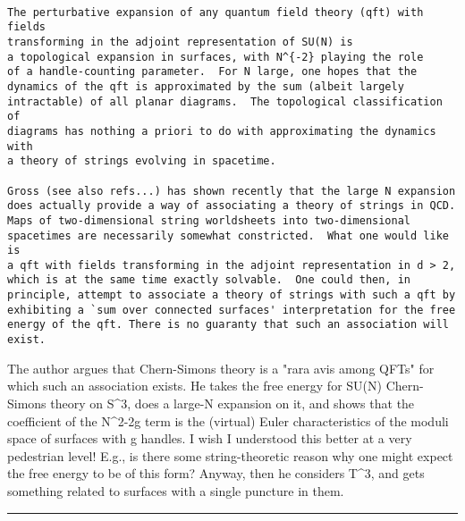\begin{verbatim}

The perturbative expansion of any quantum field theory (qft) with fields
transforming in the adjoint representation of SU(N) is
a topological expansion in surfaces, with N^{-2} playing the role
of a handle-counting parameter.  For N large, one hopes that the
dynamics of the qft is approximated by the sum (albeit largely
intractable) of all planar diagrams.  The topological classification of
diagrams has nothing a priori to do with approximating the dynamics with
a theory of strings evolving in spacetime.

Gross (see also refs...) has shown recently that the large N expansion
does actually provide a way of associating a theory of strings in QCD.
Maps of two-dimensional string worldsheets into two-dimensional
spacetimes are necessarily somewhat constricted.  What one would like is
a qft with fields transforming in the adjoint representation in d > 2,
which is at the same time exactly solvable.  One could then, in
principle, attempt to associate a theory of strings with such a qft by
exhibiting a `sum over connected surfaces' interpretation for the free
energy of the qft. There is no guaranty that such an association will exist.
\end{verbatim}
    

The author argues that Chern-Simons theory is a "rara avis among QFTs"
for which such an association exists.  He takes the free energy
for SU(N) Chern-Simons theory on S^3, does a large-N expansion on it, and shows
that the coefficient of the N^{2-2g} term is the (virtual) Euler
characteristics of the moduli space of surfaces with g handles.  I wish
I understood this better at a very pedestrian level!   E.g., is there
some string-theoretic reason why one might expect the free energy to be
of this form? Anyway, then he considers T^3, and gets something
related to surfaces with a single puncture in them.   
\par\noindent\rule{\textwidth}{0.4pt}

